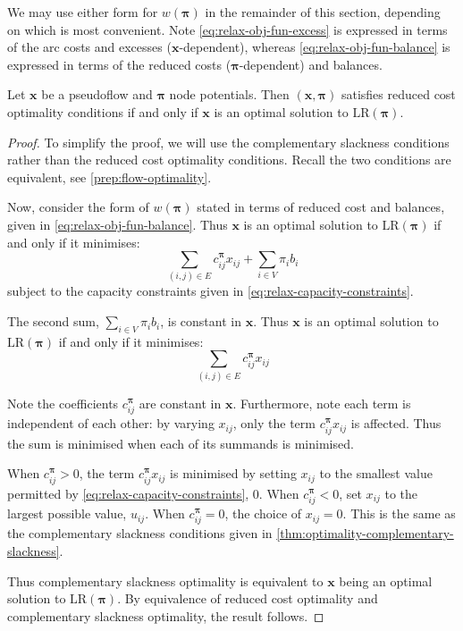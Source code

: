 We may use either form for $w(\boldsymbol{\pi})$ in the remainder of this section, depending on which is most convenient. Note \cref{eq:relax-obj-fun-excess} is expressed in terms of the arc costs and excesses ($\mathbf{x}$-dependent), whereas \cref{eq:relax-obj-fun-balance} is expressed in terms of the reduced costs ($\boldsymbol{\pi}$-dependent) and balances.

\begin{lemma} \label{lemma:relax-rc-lr-equivalence}
Let $\mathbf{x}$ be a pseudoflow and $\boldsymbol{\pi}$ node potentials. Then $\left(\mathbf{x},\boldsymbol{\pi}\right)$ satisfies reduced cost optimality conditions if and only if $\mathbf{x}$ is an optimal solution to $\mathrm{LR}(\boldsymbol{\pi})$.
\end{lemma}
\begin{proof}
To simplify the proof, we will use the complementary slackness conditions rather than the reduced cost optimality conditions. Recall the two conditions are equivalent, see \cref{prep:flow-optimality}.

Now, consider the form of $w(\boldsymbol{\pi})$ stated in terms of reduced cost and balances, given in \cref{eq:relax-obj-fun-balance}. Thus $\mathbf{x}$ is an optimal solution to $\mathrm{LR}(\boldsymbol{\pi})$ if and only if it minimises:
\[\sum_{\left(i,j\right)\in E}c_{ij}^{\boldsymbol{\pi}}x_{ij}+\sum_{i\in V}\pi_{i}b_{i}\]
subject to the capacity constraints given in \cref{eq:relax-capacity-constraints}.

The second sum, $\sum_{i \in V} \pi_i b_i$, is constant in $\mathbf{x}$. Thus $\mathbf{x}$ is an optimal solution to $\mathrm{LR}(\boldsymbol{\pi})$ if and only if it minimises:
\[\sum_{\left(i,j\right)\in E}c_{ij}^{\boldsymbol{\pi}}x_{ij}\]

Note the coefficients $c_{ij}^{\boldsymbol{\pi}}$ are constant in $\mathbf{x}$. Furthermore, note each term is independent of each other: by varying $x_{ij}$, only the term $c_{ij}^{\boldsymbol{\pi}}x_{ij}$ is affected\footnotemark. Thus the sum is minimised when each of its summands is minimised.

When $c_{ij}^{\boldsymbol{\pi}}>0$, the term $c_{ij}^{\boldsymbol{\pi}}x_{ij}$ is minimised by setting $x_{ij}$ to the smallest value permitted by \cref{eq:relax-capacity-constraints}, $0$. When $c_{ij}^{\boldsymbol{\pi}}<0$, set $x_{ij}$ to the largest possible value, $u_{ij}$. When $c_{ij}^{\boldsymbol{\pi}}=0$, the choice of $x_{ij}=0$. This is the same as the complementary slackness conditions given in \cref{thm:optimality-complementary-slackness}. 

Thus complementary slackness optimality is equivalent to $\mathbf{x}$ being an optimal solution to $\mathrm{LR}(\boldsymbol{\pi})$. By equivalence of reduced cost optimality and complementary slackness optimality, the result follows.
\end{proof}

